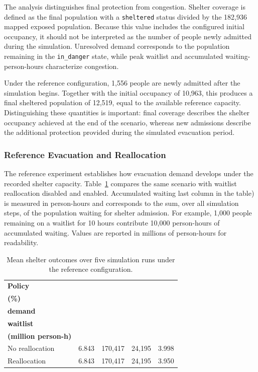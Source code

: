 The analysis distinguishes final protection from congestion. Shelter coverage is defined as the final population with a \texttt{sheltered} status divided by the 182,936 mapped exposed population. Because this value includes the configured initial occupancy, it should not be interpreted as the number of people newly admitted during the simulation. Unresolved demand corresponds to the population remaining in the \texttt{in\_danger} state, while peak waitlist and accumulated waiting-person-hours characterize congestion.

Under the reference configuration, 1,556 people are newly admitted after the simulation begins. Together with the initial occupancy of 10,963, this produces a final sheltered population of 12,519, equal to the available reference capacity. Distinguishing these quantities is important: final coverage describes the shelter occupancy achieved at the end of the scenario, whereas new admissions describe the additional protection provided during the simulated evacuation period.


\subsubsection{Reference Evacuation and Reallocation}
\label{sec:shelter_reference_reallocation}

The reference experiment establishes how evacuation demand develops under the recorded shelter capacity. Table~\ref{tbl:shelter_reference_results} compares the same scenario with waitlist reallocation disabled and enabled. Accumulated waiting last column in the table) is measured in person-hours and corresponds to the sum, over all simulation steps, of the population waiting for shelter admission. For example, 1,000 people remaining on a waitlist for 10 hours contribute 10,000 person-hours of accumulated waiting. Values are reported in millions of person-hours for readability.

\begin{table}[ht]
\centering
\footnotesize
\caption{Mean shelter outcomes over five simulation runs under the reference configuration.}
\label{tbl:shelter_reference_results}
\begin{tabular}{@{}lrrrr@{}}
\toprule
\textbf{Policy} &
\shortstack{\textbf{Coverage}\\\textbf{(\%)}} &
\shortstack{\textbf{Unresolved}\\\textbf{demand}} &
\shortstack{\textbf{Peak}\\\textbf{waitlist}} &
\shortstack{\textbf{Waiting}\\\textbf{(million person-h)}} \\
\midrule
No reallocation
    & 6.843 & 170,417 & 24,195 & 3.998 \\
Reallocation
    & 6.843 & 170,417 & 24,195 & 3.950 \\
\bottomrule
\end{tabular}
\end{table}

